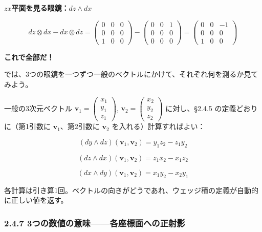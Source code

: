 \documentclass[a4paper,12pt,openany]{book}
\begin{document}
\(zx\)\textbf{平面を見る眼鏡：}\(dz \wedge dx\)

\[
dz \otimes dx - dx \otimes dz = \begin{pmatrix} 0 & 0 & 0 \\ 0 & 0 & 0 \\ 1 & 0 & 0 \end{pmatrix} - \begin{pmatrix} 0 & 0 & 1 \\ 0 & 0 & 0 \\ 0 & 0 & 0 \end{pmatrix} = \begin{pmatrix} 0 & 0 & -1 \\ 0 & 0 & 0 \\ 1 & 0 & 0 \end{pmatrix}
\]

\textbf{これで全部だ！}

では、3つの眼鏡を一つずつ一般のベクトルにかけて、それぞれ何を測るか見てみよう。

一般の3次元ベクトル
\(\mathbf{v}_1 = \begin{pmatrix} x_1 \\ y_1 \\ z_1 \end{pmatrix}\),
\(\mathbf{v}_2 = \begin{pmatrix} x_2 \\ y_2 \\ z_2 \end{pmatrix}\)
に対し、§2.4.5 の定義どおりに（第1引数に \(\mathbf{v}_1\)、第2引数に
\(\mathbf{v}_2\) を入れる）計算すればよい：

\[
(dy \wedge dz)(\mathbf{v}_1, \mathbf{v}_2) = y_1 z_2 - z_1 y_2
\]

\[
(dz \wedge dx)(\mathbf{v}_1, \mathbf{v}_2) = z_1 x_2 - x_1 z_2
\]

\[
(dx \wedge dy)(\mathbf{v}_1, \mathbf{v}_2) = x_1 y_2 - x_2 y_1
\]

各計算は引き算1回。ベクトルの向きがどうであれ、ウェッジ積の定義が自動的に正しい値を返す。

\hypertarget{ux3064ux306eux6570ux5024ux306eux610fux5473ux5404ux5ea7ux6a19ux9762ux3078ux306eux6b63ux5c04ux5f71}{%
\subsubsection{2.4.7
3つの数値の意味——各座標面への正射影}\label{ux3064ux306eux6570ux5024ux306eux610fux5473ux5404ux5ea7ux6a19ux9762ux3078ux306eux6b63ux5c04ux5f71}}
\end{document}
